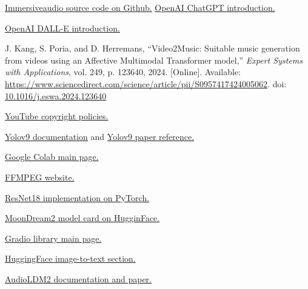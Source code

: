 \documentclass[conference]{IEEEtran}
\begin{document}
\begin{thebibliography}{00}


        \href{https://github.com/maikuvit/Immersivaudio/}{Immersiveaudio source code on Github.}
        \href{https://openai.com/index/chatgpt/}{OpenAI ChatGPT introduction.}

        \href{https://openai.com/index/dall-e/}{OpenAI DALL-E introduction.}

        J. Kang, S. Poria, and D. Herremans, ``Video2Music: Suitable music generation from videos using an Affective Multimodal Transformer model,'' \emph{Expert Systems with Applications}, vol. 249, p. 123640, 2024. [Online]. Available: \url{https://www.sciencedirect.com/science/article/pii/S0957417424005062}. doi: \href{https://doi.org/10.1016/j.eswa.2024.123640}{10.1016/j.eswa.2024.123640}

        \href{https://support.google.com/youtube/answer/6364458?hl=en}{YouTube copyright policies.}

        \href{https://docs.ultralytics.com/models/yolov9/}{Yolov9 documentation} and 
        \href{https://docs.ultralytics.com/models/yolov9/\#citations-and-acknowledgements}{Yolov9 paper reference.}
    
        \href{https://colab.research.google.com/}{Google Colab main page.}

        \href{https://ffmpeg.org}{FFMPEG website.}
    
        \href{https://pytorch.org/vision/main/models/generated/torchvision.models.resnet18.html}{ResNet18 implementation on PyTorch.}
    
        \href{https://huggingface.co/vikhyatk/moondream2}{MoonDream2 model card on HugginFace.}
    
        \href{https://www.gradio.app/}{Gradio library main page.}

     \href{https://huggingface.co/models?pipeline_tag=image-to-text&sort=trending}{HuggingFace image-to-text section.}

     \href{https://audioldm.github.io/audioldm2/}{AudioLDM2 documentation and paper.}
    
 \end{thebibliography}
\end{document}
